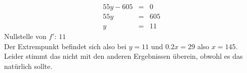 \documentclass[a4paper,11pt,fleqn]{scrartcl}
\begin{document}
\begin{enumerate}
\begin{enumerate}
                \begin{eqnarray*}
                    55y - 605 &=& 0\\
                    55y &=& 605\\
                    y &=& 11
                \end{eqnarray*}
                Nullstelle von $f'$: $11$ \\
                Der Extrempunkt befindet sich also bei $y = 11$ und $0.2x = 29$ also $x = 145$.
                Leider stimmt das nicht mit den anderen Ergebnissen überein, obwohl es das natürlich sollte.
        \end{enumerate}
\end{enumerate}
\end{document}
